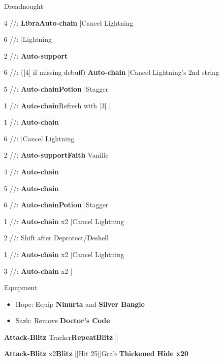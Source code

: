 \begin{fight}{Dreadnought}
	\item [4] \rav/\rav/\sab: \textbf{Libra}\to \textbf{Auto-chain} |Cancel Lightning
	\item [6] \rav/\rav/\rav: |Lightning
	\item [2] \syn/\com/\sab: \textbf{Auto-support}
	\item [6] \rav/\rav/\rav: ([4] if missing debuff) \textbf{Auto-chain} |Cancel Lightning's 2nd string
	\item [5] \rav/\rav/\rav: \textbf{Auto-chain}\to \textbf{\textbf{Potion}} |Stagger
	\item [1] \rav/\com/\rav: \textbf{Auto-chain}\to Refresh with [3] |\skip
	\item [1] \rav/\com/\rav: \textbf{Auto-chain}
	\item [6] \rav/\rav/\rav: |Cancel Lightning
	\item [2] \syn/\com/\sab: \textbf{Auto-support}\to \textbf{Faith} Vanille
	\item [4] \rav/\rav/\sab: \textbf{Auto-chain}
	\item [5] \rav/\rav/\rav: \textbf{Auto-chain}
	\item [6] \rav/\rav/\rav: \textbf{Auto-chain}\to \textbf{\textbf{Potion}} |Stagger
	\item [1] \rav/\com/\rav: \textbf{Auto-chain} x2 |Cancel Lightning
	\item [2] \syn/\com/\sab: Shift after Deprotect/Deshell
	\item [1] \rav/\com/\rav: \textbf{Auto-chain} x2 |Cancel Lightning
	\item [3] \rav/\com/\rav: \textbf{Auto-chain} x2 |\skip
\end{fight}
\begin{menu}
	\item Equipment
	\begin{itemize}
		\item Hope: Equip \textbf{Ninurta} and \textbf{Silver Bangle}
		\item Sazh: Remove \textbf{Doctor's Code}
	\end{itemize}
\end{menu}
\begin{mainlist}
	\item {}
	\item {} \textbf{Attack-Blitz} Tracker\to [2] \textbf{Repeat}\to \textbf{Blitz} ||\skip
	\item {} \textbf{Attack-Blitz} x2\to \textbf{Blitz} |\skip|Hit 25|\skip|Grab \textbf{Thickened Hide x20}
\end{mainlist}
